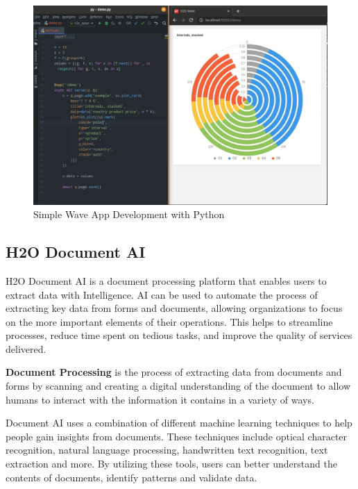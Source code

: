 \documentclass[12pt,a4paper]{report}
\begin{document}
\begin{figure}[H]
\centering
\includegraphics[width=1\textwidth]{wave.png}
\caption{Simple Wave App Development with Python}
\end{figure}

\clearpage
\subsection{H2O Document AI}

H2O Document AI is a document processing platform that enables users to extract data with Intelligence. AI can be used to automate the process of extracting key data from forms and documents, 
allowing organizations to focus on the more important elements of their operations. 
This helps to streamline processes, reduce time spent on tedious tasks, and improve 
the quality of services delivered.

\textbf{Document Processing} is the process of extracting data from documents and forms by 
scanning and creating a digital understanding of the document to allow humans to interact 
with the information it contains in a variety of ways. 


Document AI uses a combination of different machine learning techniques to help people gain 
insights from documents. These techniques include optical character recognition, 
natural language processing, handwritten text recognition, text extraction and more. By utilizing these tools, users can better understand the contents of documents, identify patterns and validate data.
\end{document}
